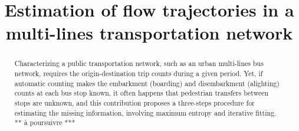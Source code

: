 \documentclass{bmcart}
\begin{document}
\begin{frontmatter}

\begin{fmbox}


\title{Estimation of flow trajectories in a multi-lines transportation network}

\author[
  addressref={aff1},                   
  corref={aff1},                       
  email={gguex@unil.ch}
]{ }
\author[
  addressref={aff2},
  email={rloup@unil.ch}
]{ }
\author[
addressref={aff1, aff2},
email={fbavaud@unil.ch}
]{ }

\address[id=aff1]{%
  ,             
  ,          
  ,                              
}
\address[id=aff2]{%
  ,
  ,          
  ,                       
}

\end{fmbox}


\begin{abstractbox}

\begin{abstract} %
Characterizing a public transportation network, such as an urban multi-lines bus network, requires the origin-destination trip counts during a given period. Yet, if automatic counting makes the embarkment (boarding) and disembarkment (alighting) counts at each bus stop known, it often happens that pedestrian transfers between stops are unknown, and this contribution proposes a three-steps procedure for estimating the missing information, involving maximum entropy and iterative fitting. ** à poursuivre ***
\end{abstract}


\begin{keyword}
\end{keyword}


\end{abstractbox}

\end{frontmatter}
\end{document}
